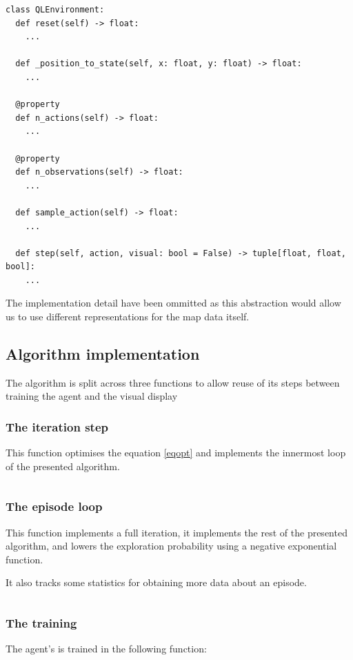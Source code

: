\documentclass[12pt]{article}
\begin{document}
\begin{verbatim}
class QLEnvironment:
  def reset(self) -> float:
    ...

  def _position_to_state(self, x: float, y: float) -> float:
    ...

  @property
  def n_actions(self) -> float:
    ...

  @property
  def n_observations(self) -> float:
    ...

  def sample_action(self) -> float:
    ...

  def step(self, action, visual: bool = False) -> tuple[float, float, bool]:
    ...

\end{verbatim}

The implementation detail have been ommitted as this abstraction would allow us to use different representations
for the map data itself.

\subsection{Algorithm implementation}

The algorithm is split across three functions to allow reuse of its steps between training the agent and
the visual display

\subsubsection{The iteration step}

This function optimises the equation \ref{eqopt} and implements the innermost loop of the presented algorithm.

\inputminted[firstline=78,lastline=94,autogobble,breaklines]{python}{algo.py}

\subsubsection{The episode loop}

This function implements a full iteration, it implements the rest of the presented algorithm, and lowers the
exploration probability using a negative exponential function.

It also tracks some statistics for obtaining more data about an episode.

\inputminted[firstline=45,lastline=60,autogobble,breaklines]{python}{algo.py}

\subsubsection{The training}
The agent's is trained in the following function:
\inputminted[firstline=39,lastline=43,autogobble,breaklines,breakanywhere]{python}{algo.py}
\end{document}

